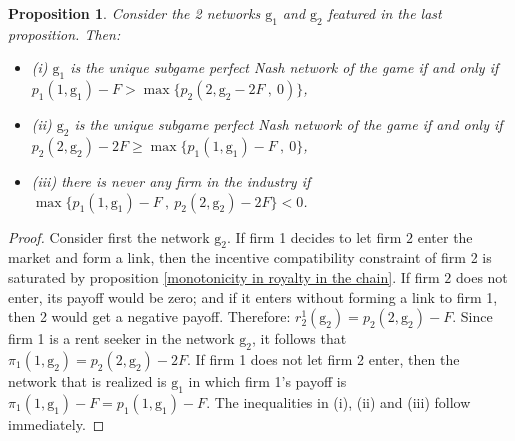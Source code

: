\documentclass{article}
\newtheorem{proposition}{Proposition}
\begin{document}
\begin{proposition}\label{fullbertrand}
Consider the 2 networks $\text{g}_1$ and $\text{g}_2$ featured in the last proposition. Then:
\begin{itemize}
\item[] (i) $\text{g}_1$ is the unique subgame perfect Nash network of the game if and only if $p_1(1,\text{g}_1)-F> \max\{p_2(2,\text{g}_2-2F~,~0)\}$,
\item[] (ii) $\text{g}_2$ is the unique subgame perfect Nash network of the game if and only if $p_2(2,\text{g}_2)-2F\geq \max\{p_1(1,\text{g}_1)-F~,~0\}$, 
\item[] (iii) there is never any firm in the industry if $\max\{p_1(1,\text{g}_1)-F~,~ p_2(2,\text{g}_2)-2F\}<0$. 
\end{itemize}
\end{proposition} 
\begin{proof}
Consider first the network $\text{g}_2$. If firm 1 decides to let firm $2$ enter the market and form a link, then the incentive compatibility constraint of firm 2 is saturated by proposition \ref{monotonicity in royalty in the chain}. If firm $2$ does not enter, its payoff would be zero; and if it enters without forming a link to firm 1, then 2 would get a negative payoff. Therefore: $r^1_2(\text{g}_2)=p_2(2,\text{g}_2)-F$. Since firm 1 is a rent seeker in the network $\text{g}_2$, it follows that $\pi_1(1,\text{g}_2)=p_2(2,\text{g}_2)-2F$. If firm 1 does not let firm 2 enter, then the network that is realized is $\text{g}_1$ in which firm 1's payoff is $\pi_1(1,\text{g}_1)-F=p_1(1,\text{g}_1)-F$. The inequalities in (i), (ii) and (iii) follow immediately.  
\end{proof}
\end{document}
